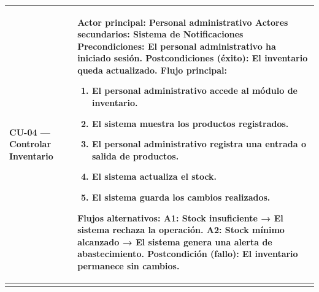 \documentclass[
]{article}
\newcounter{none} %
\begin{document}
{\def\LTcaptype{none} %
\begin{longtable}[]{|
  >{\raggedright\arraybackslash}p{}|
  >{\raggedright\arraybackslash}p{}|}
\hline
\begin{minipage}[b]{\linewidth}\raggedright
\textbf{CU-04 --- Controlar Inventario}
\end{minipage} & \begin{minipage}[b]{\linewidth}\raggedright
\textbf{Actor principal:} Personal administrativo \textbf{Actores secundarios:}
Sistema de Notificaciones \textbf{Precondiciones:} El personal administrativo ha iniciado sesión. \textbf{Postcondiciones (éxito):} El inventario queda actualizado. \textbf{Flujo principal:}

\begin{enumerate}
\def\labelenumi{\arabic{enumi}.}
\item
  El personal administrativo accede al módulo de inventario.
\item
  El sistema muestra los productos registrados.
\item
  El personal administrativo registra una entrada o salida de productos.
\item
  El sistema actualiza el stock.
\item
  El sistema guarda los cambios realizados.
\end{enumerate}

\textbf{Flujos alternativos:} A1: Stock insuficiente → El sistema rechaza la operación. A2: Stock mínimo alcanzado → El sistema genera una alerta de
abastecimiento. \textbf{Postcondición (fallo):} El inventario permanece sin cambios.
\end{minipage} \\
\hline
\endhead
\hline
\endlastfoot
\end{longtable}
}
\end{document}
